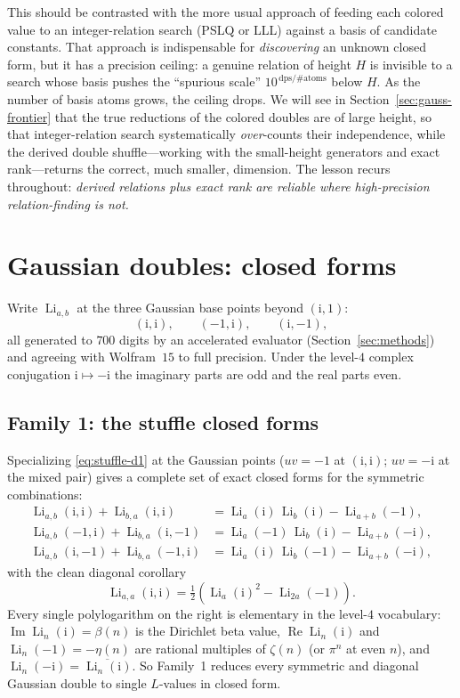 \documentclass[11pt]{article}
\DeclareMathOperator{\Li}{Li}
\DeclareMathOperator{\Real}{Re}
\DeclareMathOperator{\Imag}{Im}
\newcommand{\iu}{\mathrm{i}}
\theoremstyle{plain}
\theoremstyle{remark}
\begin{document}
This should be contrasted with the more usual approach of feeding each colored value to an
integer-relation search (PSLQ or LLL) against a basis of candidate constants. That approach is
indispensable for \emph{discovering} an unknown closed form, but it has a precision ceiling: a
genuine relation of height $H$ is invisible to a search whose basis pushes the ``spurious scale''
$10^{\,\mathrm{dps}/\#\mathrm{atoms}}$ below $H$. As the number of basis atoms grows, the ceiling
drops. We will see in Section~\ref{sec:gauss-frontier} that the true reductions of the colored
doubles are of large height, so that integer-relation search systematically \emph{over}-counts their
independence, while the derived double shuffle---working with the small-height generators and exact
rank---returns the correct, much smaller, dimension. The lesson recurs throughout: \emph{derived
relations plus exact rank are reliable where high-precision relation-finding is not.}

\section{Gaussian doubles: closed forms}\label{sec:gauss-fam}

Write $\Li_{a,b}$ at the three Gaussian base points beyond $(\iu,1)$:
\[
  (\iu,\iu),\qquad (-1,\iu),\qquad (\iu,-1),
\]
all generated to $700$ digits by an accelerated evaluator (Section~\ref{sec:methods}) and agreeing
with Wolfram~$15$ to full precision. Under the level-$4$ complex conjugation $\iu\mapsto-\iu$ the
imaginary parts are odd and the real parts even.

\subsection{Family 1: the stuffle closed forms}

Specializing \eqref{eq:stuffle-d1} at the Gaussian points ($uv=-1$ at $(\iu,\iu)$; $uv=-\iu$ at the
mixed pair) gives a complete set of exact closed forms for the symmetric combinations:
\begin{align}
  \Li_{a,b}(\iu,\iu)+\Li_{b,a}(\iu,\iu)   &= \Li_a(\iu)\,\Li_b(\iu)   -\Li_{a+b}(-1),\label{eq:g-sym-ii}\\
  \Li_{a,b}(-1,\iu)+\Li_{b,a}(\iu,-1)     &= \Li_a(-1)\,\Li_b(\iu)    -\Li_{a+b}(-\iu),\label{eq:g-sym-mix}\\
  \Li_{a,b}(\iu,-1)+\Li_{b,a}(-1,\iu)     &= \Li_a(\iu)\,\Li_b(-1)    -\Li_{a+b}(-\iu),\nonumber
\end{align}
with the clean diagonal corollary
\begin{equation}\label{eq:g-diag}
  \Li_{a,a}(\iu,\iu)=\tfrac12\!\left(\Li_a(\iu)^2-\Li_{2a}(-1)\right).
\end{equation}
Every single polylogarithm on the right is elementary in the level-$4$ vocabulary:
$\Imag\Li_n(\iu)=\beta(n)$ is the Dirichlet beta value, $\Real\Li_n(\iu)$ and $\Li_n(-1)=-\eta(n)$
are rational multiples of $\zeta(n)$ (or $\pi^n$ at even $n$), and $\Li_n(-\iu)=\overline{\Li_n(\iu)}$.
So Family~1 reduces every symmetric and diagonal Gaussian double to single $L$-values in closed form.
\end{document}
